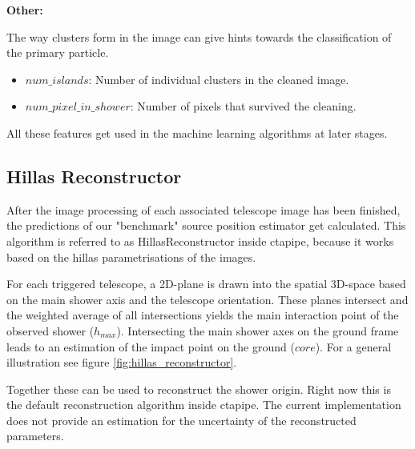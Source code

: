 \textbf{Other:}

The way clusters form in the image can give hints towards the classification of the primary particle.
\begin{itemize}
    \item{$num\_islands$: Number of individual clusters in the cleaned image.}
    \item{$num\_pixel\_in\_shower$: Number of pixels that survived the cleaning.}
\end{itemize}

All these features get used in the machine learning algorithms at later stages.

\subsection{Hillas Reconstructor}  %
After the image processing of each associated telescope image has been finished,
the predictions of our "benchmark" source position estimator get calculated.
This algorithm is referred to as HillasReconstructor inside ctapipe, because 
it works based on the hillas parametrisations of the images.

For each triggered telescope, a 2D-plane is drawn into the spatial 3D-space based on the main shower 
axis and the telescope orientation. These planes intersect and 
the weighted average of all intersections yields the 
main interaction point of the observed shower ($h_{max}$).
Intersecting the main shower axes on the ground frame leads to 
an estimation of the impact point on the ground ($core$).
For a general illustration see figure \ref{fig:hillas_reconstructor}.

Together these can be used to reconstruct the shower origin.
Right now this is the default reconstruction algorithm inside ctapipe.
The current implementation does not provide an 
estimation for the uncertainty of the reconstructed parameters.

